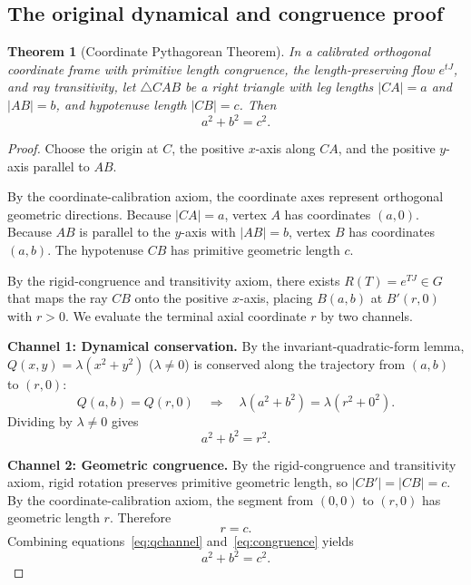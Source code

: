 \documentclass[11pt,a4paper]{article}
\newtheorem{theorem}{Theorem}[section]
\begin{document}
\subsection{The original dynamical and congruence proof}
\begin{theorem}[Coordinate Pythagorean Theorem]
In a calibrated orthogonal coordinate frame with primitive length congruence, the length-preserving flow $e^{tJ}$, and ray transitivity, let $\triangle CAB$ be a right triangle with leg lengths $|CA|=a$ and $|AB|=b$, and hypotenuse length $|CB|=c$. Then
\[
a^2+b^2=c^2.
\]
\end{theorem}
\begin{proof}
Choose the origin at $C$, the positive $x$-axis along $CA$, and the positive $y$-axis parallel to $AB$.

By the coordinate-calibration axiom, the coordinate axes represent orthogonal geometric directions. Because $|CA|=a$, vertex $A$ has coordinates $(a,0)$. Because $AB$ is parallel to the $y$-axis with $|AB|=b$, vertex $B$ has coordinates $(a,b)$. The hypotenuse $CB$ has primitive geometric length $c$.

By the rigid-congruence and transitivity axiom, there exists $R(T)=e^{TJ}\in G$ that maps the ray $CB$ onto the positive $x$-axis, placing $B(a,b)$ at $B'(r,0)$ with $r>0$. We evaluate the terminal axial coordinate $r$ by two channels.

\medskip\noindent\textbf{Channel 1: Dynamical conservation.}
By the invariant-quadratic-form lemma, $Q(x,y)=\lambda(x^2+y^2)$ ($\lambda\ne0$) is conserved along the trajectory from $(a,b)$ to $(r,0)$:
\begin{equation}
Q(a,b)=Q(r,0)\quad\Longrightarrow\quad \lambda(a^2+b^2)=\lambda(r^2+0^2).
\end{equation}
Dividing by $\lambda\ne0$ gives
\begin{equation}\label{eq:qchannel} a^2+b^2=r^2.\end{equation}

\medskip\noindent\textbf{Channel 2: Geometric congruence.}
By the rigid-congruence and transitivity axiom, rigid rotation preserves primitive geometric length, so $|CB'|=|CB|=c$. By the coordinate-calibration axiom, the segment from $(0,0)$ to $(r,0)$ has geometric length $r$. Therefore
\begin{equation}\label{eq:congruence}r=c.\end{equation}
Combining equations~\eqref{eq:qchannel} and~\eqref{eq:congruence} yields
\begin{equation}a^2+b^2=c^2.\end{equation}
\end{proof}
\end{document}
